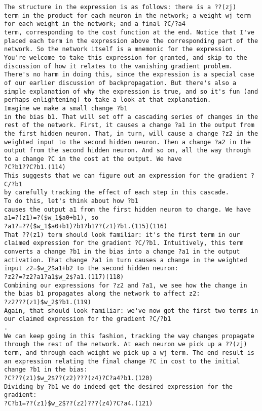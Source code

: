 \begin{lstlisting}
The structure in the expression is as follows: there is a ??(zj)
term in the product for each neuron in the network; a weight wj term for each weight in the network; and a final ?C/?a4
term, corresponding to the cost function at the end. Notice that I've placed each term in the expression above the corresponding part of the network. So the network itself is a mnemonic for the expression.
You're welcome to take this expression for granted, and skip to the discussion of how it relates to the vanishing gradient problem. There's no harm in doing this, since the expression is a special case of our earlier discussion of backpropagation. But there's also a simple explanation of why the expression is true, and so it's fun (and perhaps enlightening) to take a look at that explanation.
Imagine we make a small change ?b1
in the bias b1. That will set off a cascading series of changes in the rest of the network. First, it causes a change ?a1 in the output from the first hidden neuron. That, in turn, will cause a change ?z2 in the weighted input to the second hidden neuron. Then a change ?a2 in the output from the second hidden neuron. And so on, all the way through to a change ?C in the cost at the output. We have 
?C?b1??C?b1.(114)
This suggests that we can figure out an expression for the gradient ?C/?b1
by carefully tracking the effect of each step in this cascade.
To do this, let's think about how ?b1
causes the output a1 from the first hidden neuron to change. We have a1=?(z1)=?($w_1$a0+b1), so 
?a1?=??($w_1$a0+b1)?b1?b1??(z1)?b1.(115)(116)
That ??(z1) term should look familiar: it's the first term in our claimed expression for the gradient ?C/?b1. Intuitively, this term converts a change ?b1 in the bias into a change ?a1 in the output activation. That change ?a1 in turn causes a change in the weighted input z2=$w_2$a1+b2 to the second hidden neuron: 
?z2?=?z2?a1?a1$w_2$?a1.(117)(118)
Combining our expressions for ?z2 and ?a1, we see how the change in the bias b1 propagates along the network to affect z2: 
?z2???(z1)$w_2$?b1.(119)
Again, that should look familiar: we've now got the first two terms in our claimed expression for the gradient ?C/?b1
.
We can keep going in this fashion, tracking the way changes propagate through the rest of the network. At each neuron we pick up a ??(zj)
term, and through each weight we pick up a wj term. The end result is an expression relating the final change ?C in cost to the initial change ?b1 in the bias: 
?C???(z1)$w_2$??(z2)???(z4)?C?a4?b1.(120)
Dividing by ?b1 we do indeed get the desired expression for the gradient: 
?C?b1=??(z1)$w_2$??(z2)???(z4)?C?a4.(121)

\end{lstlisting}
